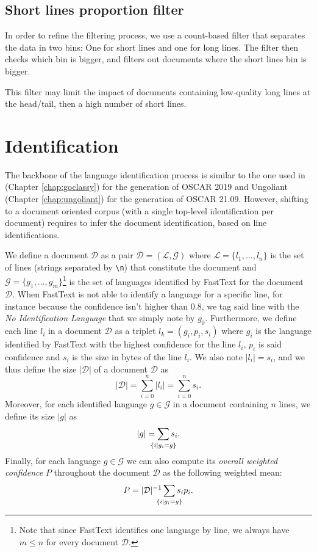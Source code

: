\subsection{Short lines proportion filter}

In order to refine the filtering process, we use a count-based filter that separates the data in two bins: One for short lines and one for long lines. The filter then checks which bin is bigger, and filters out documents where the short lines bin is bigger.

This filter may limit the impact of documents containing low-quality long lines at the head/tail, then a high number of short lines.


\section{Identification}\label{towards-sec:identification}

The backbone of the language identification process is similar to the one used in \goclassy (Chapter \ref{chap:goclassy}) for the generation of OSCAR 2019 and Ungoliant (Chapter \ref{chap:ungoliant}) for the generation of OSCAR 21.09. However, shifting to a document oriented corpus (with a single top-level identification per document) requires to infer the document identification, based on line identifications.


We define a document $\mathcal{D}$ as a pair $\mathcal{D}=(\mathcal{L}, \mathcal{G})$ where $\mathcal{L}=\{l_1,\ldots,l_n\}$ is the set of lines (strings separated by \texttt{\textbackslash n}) that constitute the document and $\mathcal{G} = \{g_1, \ldots, g_m\}$\footnote{Note that since FastText identifies one language by line, we always have $m\le n$ for every document $\mathcal{D}$.} is the set of languages identified by FastText for the document $\mathcal{D}$. When FastText is not able to identify a language for a specific line, for instance because the confidence isn't higher than $0.8$, we tag said line with the \emph{No Identification Language} that we simply note by $g_0$. Furthermore, we define each line $l_i$ in a document $\mathcal{D}$ as a triplet $l_k=(g_i, p_i, s_i)$ where $g_i$ is the language identified by FastText with the highest confidence for the line $l_i$, $p_i$ is said confidence and $s_i$ is the size in bytes of the line $l_i$. We also note $|l_i|=s_i$, and we thus define the size $|\mathcal{D}|$ of a document $\mathcal{D}$ as
\[
    |\mathcal{D}| = \sum_{i=0}^{n} |l_i| = \sum_{i=0}^{n} s_i.
\]
Moreover, for each identified language $g \in \mathcal{G}$ in a document containing $n$ lines, we define its size $|g|$ as
\[
    |g| = \sum_{\mathclap{\{i \mid g_i = g\}}} s_i.
\]
Finally, for each language $g \in \mathcal{G}$ we can also compute its \emph{overall weighted confidence} $P$ throughout the document $\mathcal{D}$ as the following weighted mean:
\[
    P = |\mathcal{D}|^{-1}\sum_{\mathclap{\{i \mid g_i=g\}}} s_ip_i.
\]

